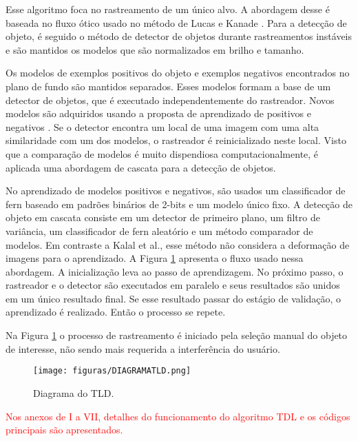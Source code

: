 	Esse algoritmo foca no rastreamento de um único alvo.  A abordagem desse é baseada no fluxo ótico usado no método de Lucas e Kanade \cite{LucasKanade}. Para a detecção de objeto, é seguido o método de detector de objetos durante rastreamentos instáveis \cite{ZKalalJMatasKMikolajczykOnline} e são mantidos os modelos que são normalizados em brilho e tamanho. 
	
Os modelos de exemplos positivos do objeto e exemplos negativos encontrados no plano de fundo são mantidos separados. Esses modelos formam a  base de um detector de objetos, que é executado independentemente do rastreador. Novos modelos são adquiridos usando a proposta de aprendizado de positivos e negativos \cite{ZKalalJMatasKMikolajczykPN}. Se o detector encontra um local de uma imagem com uma alta similaridade com um dos modelos, o rastreador é reinicializado neste local. Visto que a comparação de modelos é muito dispendiosa computacionalmente, é aplicada uma abordagem de cascata para a detecção de objetos. 

No aprendizado de modelos positivos e negativos, são usados um classificador de fern \cite{MOzuysal} baseado em padrões binários de 2-bits e um modelo único fixo. A detecção de objeto em cascata consiste em um detector de primeiro plano, um filtro de variância, um classificador de fern aleatório \cite{VLepetitPLaggerPFua} e um método comparador de modelos. Em contraste a Kalal et al., esse método não considera a deformação de imagens para o aprendizado. A Figura \ref{DIAGRAMATLD} apresenta o fluxo usado nessa abordagem. A inicialização leva ao passo de aprendizagem. No próximo passo, o rastreador e o detector são executados em paralelo e seus resultados são unidos em um único resultado final. Se esse resultado passar do estágio de validação, o aprendizado é realizado. Então o processo se repete. 

Na Figura \ref{DIAGRAMATLD} o processo de rastreamento é iniciado pela seleção manual do objeto de interesse, não sendo mais requerida a interferência do usuário.

\begin{figure}
	\centering
	\texttt{[image: figuras/DIAGRAMATLD.png]}
    \caption{Diagrama do TLD.\cite{NebehayGeorg}}
    \label{DIAGRAMATLD}
\end{figure}

\textcolor{red}{Nos anexos de I a VII, detalhes do funcionamento do algoritmo TDL e os códigos principais são apresentados.}

